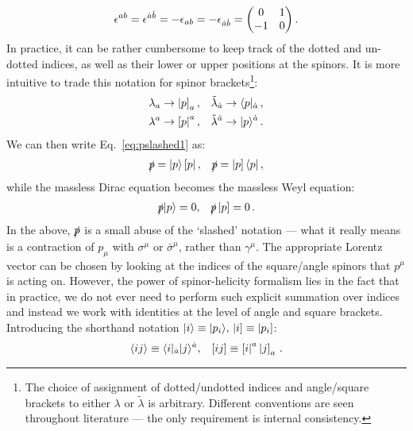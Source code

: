 \documentclass[main.tex]{subfiles}
\begin{document}
\begin{equation}
    \epsilon^{ab} = \epsilon^{\dot{a}\dot{b}} = -\epsilon_{ab} = -\epsilon_{\dot{a}\dot{b}} = 
    \begin{pmatrix}
        0 & 1 \\
        -1 & 0
    \end{pmatrix}.
\end{equation}
In practice, it can be rather cumbersome to keep track of the dotted and un-dotted indices, as well as their lower or upper positions at the spinors. It is more intuitive to trade this notation for spinor brackets\footnote{The choice of assignment of dotted/undotted indices and angle/square brackets to either $\lambda$ or $\tilde{\lambda}$ is arbitrary. Different conventions are seen throughout literature --- the only requirement is internal consistency.}:
\begin{align} \label{eq:lambdatobraket}
    \lambda_a  &\rightarrow \left| p \right]_a,  &&\tilde{\lambda}_{\dot{a}} \rightarrow \langle p|_{\dot{a}}\,, \nonumber \\*
    \lambda^a  &\rightarrow \left[ p \right|^a,  &&\tilde{\lambda}^{\dot{a}} \rightarrow |p \rangle^{\dot{a}} \,.
\end{align}
We can then write Eq.~\ref{eq:pslashed1} as:
\begin{align} \label{eq:pslashed2}
    \slashed{p} = |p \rangle\left[ p \right|, && \slashed{p} = \left| p \right] \langle p| \,,
\end{align}
while the massless Dirac equation becomes the massless Weyl equation:
\begin{align} \label{eq:weyleq}
    \slashed{p}|p \rangle = 0, && \slashed{p}\left| p \right] = 0\,.
\end{align}
In the above, $\slashed{p}$ is a small abuse of the `slashed' notation --- what it really means is a contraction of $p_\mu$ with $\sigma^\mu$ or $\bar{\sigma}^\mu$, rather than $\gamma^\mu$. The appropriate Lorentz vector can be chosen by looking at the indices of the square/angle spinors that $p^\mu$ is acting on. However, the power of spinor-helicity formalism lies in the fact that in practice, we do not ever need to perform such explicit summation over indices and instead we work with identities at the level of angle and square brackets. Introducing the shorthand notation $|i \rangle \equiv |p_i \rangle,\, \left| i \right] \equiv \left| p_i \right]$: 
\begin{align}
    \langle ij \rangle \equiv \langle i|_{\dot{a}} |j \rangle^{\dot{a}}, && [ ij ] \equiv \left[ i \right|^a \left| j \right]_a \,. 
\end{align}
\end{document}
